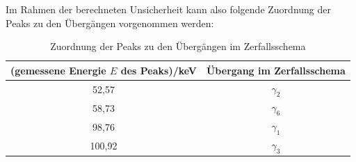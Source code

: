 \documentclass[german,  %
parskip=full,  %
]{scrartcl}
\begin{document}
Im Rahmen der berechneten Unsicherheit kann also folgende Zuordnung der Peaks zu den Übergängen vorgenommen werden:
\\
\begin{table}[h!]\centering
\begin{tabular}{|c|c|}\hline
(gemessene Energie $E$ des Peaks)/keV & Übergang im Zerfallsschema \\\hline
52,57 & $\gamma_{2}$ \\\hline
58,73 & $\gamma_{6}$ \\\hline
98,76 & $\gamma_{1}$ \\\hline
100,92 & $\gamma_{3}$ \\\hline
\end{tabular}
\caption{Zuordnung der Peaks zu den Übergängen im Zerfallsschema}
\end{table}
\\
\end{document}
